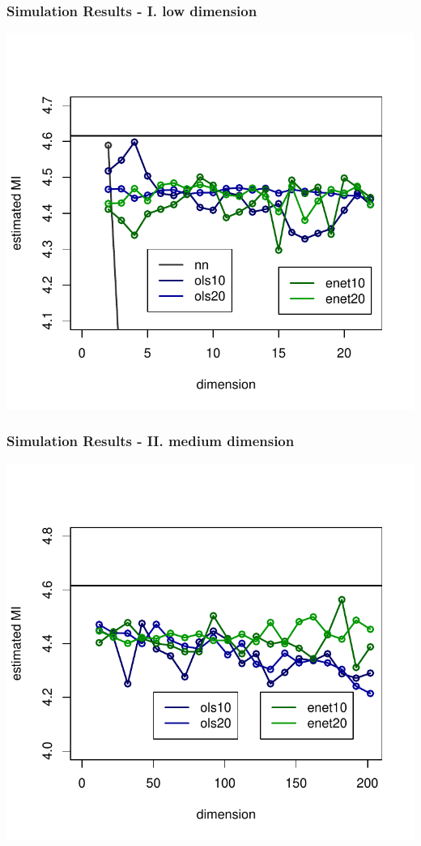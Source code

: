 \documentclass{beamer}
\begin{document}
\begin{frame}
\frametitle{Simulation Results - I. low dimension}
\begin{center}
\includegraphics[scale = 0.65]{../idloss/sim2a_fig1a.pdf}
\end{center}
\end{frame}

\begin{frame}
\frametitle{Simulation Results - II. medium dimension}
\begin{center}
\includegraphics[scale = 0.65]{../idloss/sim2a_fig2.pdf}
\end{center}
\end{frame}
\end{document}
